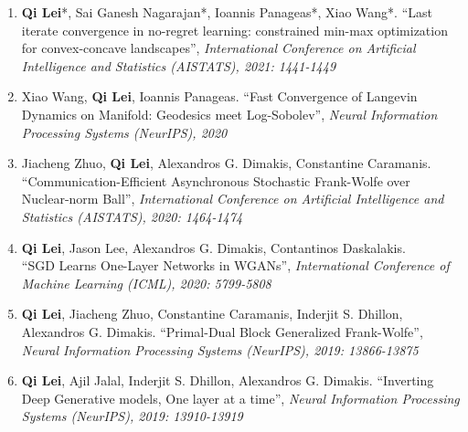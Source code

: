 \documentclass[margin, 10pt]{res} %
\begin{document}
\begin{resume}
\begin{enumerate}
	\item{\textbf{Qi Lei}*, Sai Ganesh Nagarajan*, Ioannis Panageas*, Xiao Wang*. ``Last iterate convergence in no-regret learning: constrained min-max optimization for convex-concave landscapes'',\textit{ International Conference on
			Artificial Intelligence and Statistics (AISTATS), 2021: 1441-1449}}
	\item{ Xiao Wang, \textbf{Qi Lei}, Ioannis Panageas. ``Fast Convergence of Langevin Dynamics on Manifold: Geodesics meet Log-Sobolev'', \textit{Neural Information Processing Systems (NeurIPS), 2020 }  }
\item{Jiacheng Zhuo, \textbf{Qi Lei}, Alexandros G. Dimakis, Constantine 
      Caramanis.\\ ``Communication-Efficient Asynchronous Stochastic 
    Frank-Wolfe over Nuclear-norm Ball'', \textit{ International Conference on Artificial Intelligence and Statistics (AISTATS), 2020: 1464-1474} }
\item{\textbf{Qi Lei}, Jason Lee, Alexandros G. Dimakis, Contantinos 
  Daskalakis. \\ ``SGD Learns One-Layer Networks in WGANs'', 
    \textit{International Conference of Machine Learning (ICML), 2020: 5799-5808}}
  \item{ \textbf{Qi Lei}, Jiacheng Zhuo, Constantine Caramanis, Inderjit S. 
    Dhillon, Alexandros G. Dimakis. ``Primal-Dual Block Generalized Frank-Wolfe'', 
  \textit{Neural Information Processing Systems (NeurIPS), 2019: 13866-13875} }
  \item{ \textbf{Qi Lei}, Ajil Jalal, Inderjit S. Dhillon, Alexandros G. 
      Dimakis. ``Inverting Deep Generative models, One layer at a time'', 
    \textit{Neural Information Processing Systems (NeurIPS), 2019: 13910-13919} }


\end{enumerate}
\end{resume}
\end{document}
